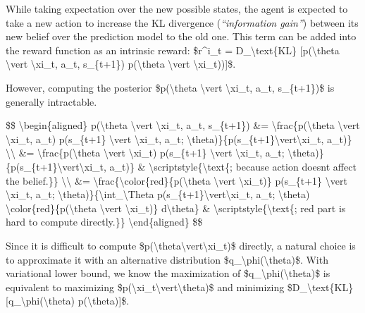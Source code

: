 While taking expectation over the new possible states, the agent is expected to take a new action to increase the KL divergence (\emph{``information gain''}) between its new belief over the prediction model to the old one. This term can be added into the reward function as an intrinsic reward: \$r\^{}i\_t = D\_\textbackslash text\{KL\} {[}p(\textbackslash theta \textbackslash vert \textbackslash xi\_t, a\_t, s\_\{t+1\}) \textbar{} p(\textbackslash theta \textbackslash vert \textbackslash xi\_t)){]}\$.

However, computing the posterior \$p(\textbackslash theta \textbackslash vert \textbackslash xi\_t, a\_t, s\_\{t+1\})\$ is generally intractable.

\$\$ \textbackslash begin\{aligned\} p(\textbackslash theta \textbackslash vert \textbackslash xi\_t, a\_t, s\_\{t+1\}) \&= \textbackslash frac\{p(\textbackslash theta \textbackslash vert \textbackslash xi\_t, a\_t) p(s\_\{t+1\} \textbackslash vert \textbackslash xi\_t, a\_t; \textbackslash theta)\}\{p(s\_\{t+1\}\textbackslash vert\textbackslash xi\_t, a\_t)\} \textbackslash\textbackslash{} \&= \textbackslash frac\{p(\textbackslash theta \textbackslash vert \textbackslash xi\_t) p(s\_\{t+1\} \textbackslash vert \textbackslash xi\_t, a\_t; \textbackslash theta)\}\{p(s\_\{t+1\}\textbackslash vert\textbackslash xi\_t, a\_t)\} \& \textbackslash scriptstyle\{\textbackslash text\{; because action doesn\textquotesingle t affect the belief.\}\} \textbackslash\textbackslash{} \&= \textbackslash frac\{\textbackslash color\{red\}\{p(\textbackslash theta \textbackslash vert \textbackslash xi\_t)\} p(s\_\{t+1\} \textbackslash vert \textbackslash xi\_t, a\_t; \textbackslash theta)\}\{\textbackslash int\_\textbackslash Theta p(s\_\{t+1\}\textbackslash vert\textbackslash xi\_t, a\_t; \textbackslash theta) \textbackslash color\{red\}\{p(\textbackslash theta \textbackslash vert \textbackslash xi\_t)\} d\textbackslash theta\} \& \textbackslash scriptstyle\{\textbackslash text\{; red part is hard to compute directly.\}\} \textbackslash end\{aligned\} \$\$

Since it is difficult to compute \$p(\textbackslash theta\textbackslash vert\textbackslash xi\_t)\$ directly, a natural choice is to approximate it with an alternative distribution \$q\_\textbackslash phi(\textbackslash theta)\$. With variational lower bound, we know the maximization of \$q\_\textbackslash phi(\textbackslash theta)\$ is equivalent to maximizing \$p(\textbackslash xi\_t\textbackslash vert\textbackslash theta)\$ and minimizing \$D\_\textbackslash text\{KL\}{[}q\_\textbackslash phi(\textbackslash theta) \textbar{} p(\textbackslash theta){]}\$.

